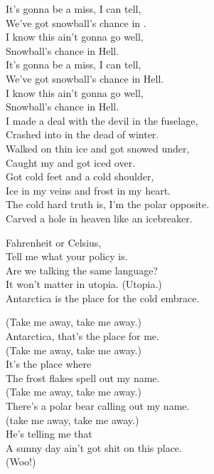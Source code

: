 
It's gonna be a miss, I can tell, \\
We've got snowball's chance in . \\
I know this ain't gonna go well, \\
Snowball's chance in Hell. \\
It's gonna be a miss, I can tell, \\
We've got snowball's chance in Hell. \\
I know this ain't gonna go well, \\
Snowball's chance in Hell. \\

I made a deal with the devil in the fuselage, \\
Crashed into  in the dead of winter. \\
Walked on thin ice and got snowed under, \\
Caught my  and got iced over. \\
Got cold feet and a cold shoulder, \\
Ice in my veins and frost in my heart. \\
The cold hard truth is, I'm the polar opposite. \\
Carved a hole in heaven like an icebreaker. \\


Fahrenheit or Celsius, \\
Tell me what your policy is. \\
Are we talking the same language? \\
It won't matter in utopia. (Utopia.) \\
Antarctica is the place for the cold embrace. \\


(Take me away, take me away.) \\
Antarctica, that's the place for me. \\
(Take me away, take me away.) \\
It's the place where \\
The frost flakes spell out my name. \\

(Take me away, take me away.) \\
There's a polar bear calling out my name. \\
(take me away, take me away.) \\
He's telling me that \\
A sunny day ain't got shit on this place. \\
(Woo!)

